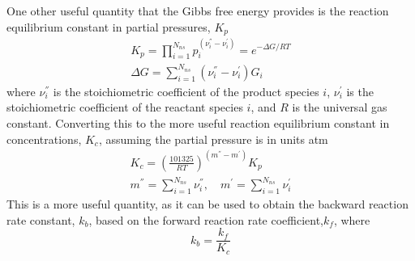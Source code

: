 \documentclass[a4paper]{article}
\begin{document}
\begin{enumerate}
    One other useful quantity that the Gibbs free energy provides is the
    reaction equilibrium constant in partial pressures, $K_p$
    \begin{gather}
      \boxed{K_p = \prod_{i=1}^{N_{ns}}{p_i^{(\nu_i^{''}-\nu_i^{'})}}
      = e^{-\Delta G /RT}} \label{kp-def} \\
      \boxed{\Delta G = \sum\limits_{i=1}^{N_{ns}}{\left(\nu_{i}^{''} -
      \nu_{i}^{'}\right) G_i}} \label{del-g-def}
    \end{gather}
    where $\nu_i^{''}$ is the stoichiometric coefficient of the product species
    $i$, $\nu_i^{'}$ is the stoichiometric coefficient of the reactant species
    $i$, and $R$ is the universal gas constant.  Converting this to the more
    useful reaction equilibrium constant in concentrations, $K_c$, assuming the
    partial pressure is in units atm
    \begin{equation}
      \begin{gathered}
        K_c = \left( \frac{101325}{RT} \right)^{(m^{''}-m^{'})} K_p \\
        m^{''} = \sum\limits_{i=1}^{N_{ns}}{\nu_i^{''}}, \quad
        m^{'} = \sum\limits_{i=1}^{N_{ns}}{\nu_i^{'}}
      \end{gathered}
      \label{kc-def}
    \end{equation}
    This is a more useful quantity, as it can be used to obtain the backward
    reaction rate constant, $k_b$, based on the forward reaction rate
    coefficient,$k_f$, where
    \begin{equation}
      k_b = \frac{k_f}{K_c}
      \label{kb-def}
    \end{equation}





\end{enumerate}
\end{document}
